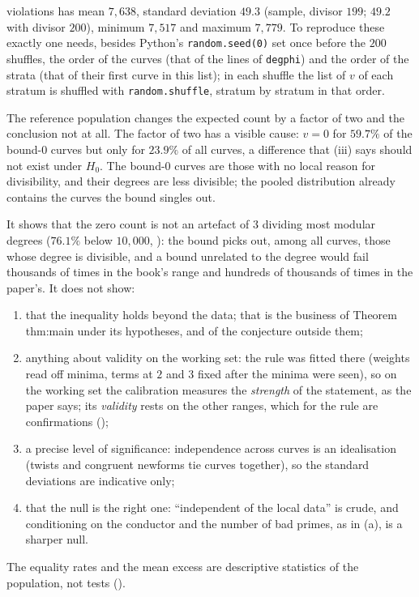 \begin{sloppypar}
\begin{example}
\begin{enumerate}[label=(\alph*)]
violations has mean $7{,}638$, standard deviation $49.3$ (sample, divisor $199$; $49.2$ with divisor $200$), minimum $7{,}517$ and maximum $7{,}779$. To reproduce
these exactly one needs, besides Python's \texttt{random.seed(0)} set once before the $200$ shuffles, the order of the curves (that of the lines of
\texttt{degphi}) and the order of the strata (that of their first curve in this list); in each shuffle the list of $v$ of each stratum is shuffled with
\texttt{random.shuffle}, stratum by stratum in that order.
\end{enumerate}
The reference population changes the expected count by a factor of two and the conclusion not at all. The factor of two has a visible cause:
$v=0$ for $59.7\%$ of the bound-$0$ curves but only for $23.9\%$ of all curves, a difference that (iii) says should not exist
under $H_0$. The bound-$0$ curves are those with no local reason for divisibility, and their degrees are less divisible; the pooled distribution
already contains the curves the bound singles out.
\end{example}

\begin{remark}\label{rem:computation:calibration-reading}
It shows that the zero count is not an artefact of $3$ dividing most modular degrees ($76.1\%$ below $10{,}000$, ): the
bound picks out, among all curves, those whose degree is divisible, and a bound unrelated to the degree would fail thousands of times in the book's
range and hundreds of thousands of times in the paper's. It does not show:
\begin{enumerate}[label=(\alph*)]
\item that the inequality holds beyond the data; that is the business of Theorem thm:main under its hypotheses, and of the conjecture outside them;
\item anything about validity on the working set: the rule was fitted there (weights read off minima, terms at $2$ and $3$ fixed after the minima
were seen), so on the working set the calibration measures the \emph{strength} of the statement, as the paper says; its \emph{validity} rests on the
other ranges, which for the rule are confirmations ();
\item a precise level of significance: independence across curves is an idealisation (twists and congruent newforms tie curves together), so the
standard deviations are indicative only;
\item that the null is the right one: ``independent of the local data'' is crude, and conditioning on the conductor and the number of bad primes,
as in (a), is a sharper null.
\end{enumerate}
The equality rates and the mean excess are descriptive statistics of the population, not tests ().
\end{remark}


\end{sloppypar}
